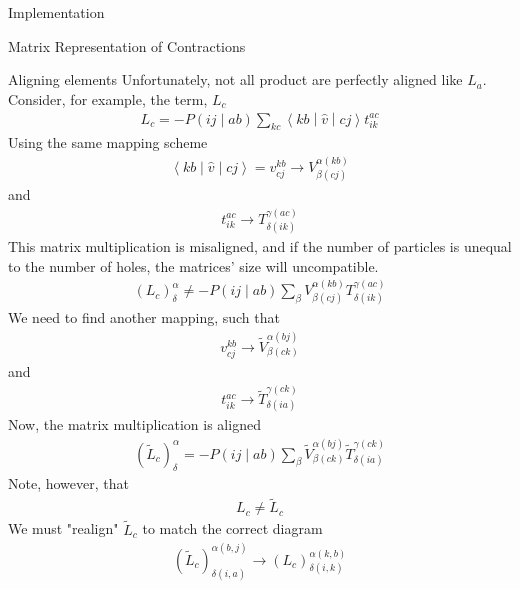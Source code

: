 \documentclass[twoside,english]{uiofysmaster}
\begin{document}
\begin{chapter}{Implementation}
\begin{section}{Matrix Representation of Contractions}
		\begin{subsection}{Aligning elements}	
			Unfortunately, not all product are perfectly aligned like $L_a$. Consider, for example, the term, $L_c$
			\begin{align}
				L_c = -P\left(ij\middle|ab\right) \sum_{kc} \left<kb\middle|\hat v\middle|cj\right>t_{ik}^{ac}
			\end{align}
			Using the same mapping scheme
			\begin{align}
				\left<kb\middle|\hat v\middle|cj\right> = v_{cj}^{kb} \rightarrow V_{\beta(cj)}^{\alpha(kb)}
			\end{align}
			and
			\begin{align}
				t_{ik}^{ac} \rightarrow T_{\delta(ik)}^{\gamma(ac)}
			\end{align}
			This matrix multiplication is misaligned, and if the number of particles is unequal to the number of holes, the matrices' size will uncompatible. 
			\begin{align}
				(L_c)_ \delta^\alpha \neq -P\left(ij\middle|ab\right) \sum_ \beta V_{\beta(cj)}^{\alpha(kb)} T_{\delta(ik)}^{\gamma(ac)}
			\end{align}
			We need to find another mapping, such that
			\begin{align}
				v_{cj}^{kb} \rightarrow \tilde V_{\beta(ck)}^{\alpha(bj)}
			\end{align}
			and 
			\begin{align}
				t_{ik}^{ac} \rightarrow \tilde T_{\delta(ia)}^{\gamma(ck)}
			\end{align}
			Now, the matrix multiplication is aligned
			\begin{align}
				(\tilde L_c)_ \delta^\alpha = -P\left(ij\middle|ab\right) \sum_ \beta \tilde V_{\beta(ck)}^{\alpha(bj)} \tilde T_{\delta(ia)}^{\gamma(ck)}
			\end{align}
			Note, however, that 
			\begin{align}
				L_c \neq \tilde L_c
			\end{align}
			We must "realign" $\tilde L_c$ to match the correct diagram
			\begin{align}
				(\tilde L_c)_{\delta(i,a)}^{\alpha(b,j)} \rightarrow (L_c)_{\delta(i,k)}^{\alpha(k,b)}
			\end{align}


\end{subsection}
\end{section}
\end{chapter}
\end{document}
